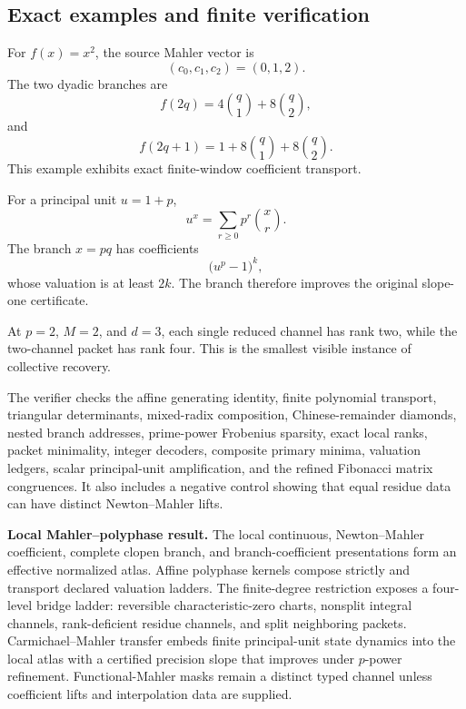 \documentclass[11pt]{article}
\theoremstyle{definition}
\theoremstyle{remark}
\begin{document}
\subsection{Exact examples and finite verification}
\label{subsec:block08-verification}

For \(f(x)=x^2\), the source Mahler vector is
\[
 (c_0,c_1,c_2)=(0,1,2).
\]
The two dyadic branches are
\[
 f(2q)=4\binom q1+8\binom q2,
\]
and
\[
 f(2q+1)=1+8\binom q1+8\binom q2.
\]
This example exhibits exact finite-window coefficient transport.

For a principal unit \(u=1+p\),
\[
 u^x=\sum_{r\geq0}p^r\binom xr.
\]
The branch \(x=pq\) has coefficients
\[
 \bigl(u^p-1\bigr)^k,
\]
whose valuation is at least \(2k\).  The branch therefore improves the original slope-one certificate.

At \(p=2\), \(M=2\), and \(d=3\), each single reduced channel has rank two, while the two-channel packet has rank four.  This is the smallest visible instance of collective recovery.




The verifier checks the affine generating identity, finite polynomial transport, triangular determinants, mixed-radix composition, Chinese-remainder diamonds, nested branch addresses, prime-power Frobenius sparsity, exact local ranks, packet minimality, integer decoders, composite primary minima, valuation ledgers, scalar principal-unit amplification, and the refined Fibonacci matrix congruences.  It also includes a negative control showing that equal residue data can have distinct Newton--Mahler lifts.

\begin{resultbox}
\textbf{Local Mahler--polyphase result.}
The local continuous, Newton--Mahler coefficient, complete clopen branch, and branch-coefficient presentations form an effective normalized atlas.  Affine polyphase kernels compose strictly and transport declared valuation ladders.  The finite-degree restriction exposes a four-level bridge ladder: reversible characteristic-zero charts, nonsplit integral channels, rank-deficient residue channels, and split neighboring packets.  Carmichael--Mahler transfer embeds finite principal-unit state dynamics into the local atlas with a certified precision slope that improves under \(p\)-power refinement.  Functional-Mahler masks remain a distinct typed channel unless coefficient lifts and interpolation data are supplied.
\end{resultbox}
\end{document}

